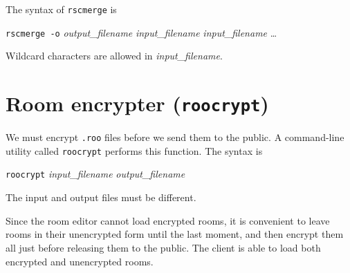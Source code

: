 The syntax of {\tt rscmerge} is

{\tt rscmerge -o} {\em output\_filename} {\em input\_filename} {\em
input\_filename} \dots

\noindent
Wildcard characters are allowed in {\em input\_filename}.

\section{Room encrypter ({\tt roocrypt})}

We must encrypt {\tt .roo} files before we send them to the public.  A
command-line utility called {\tt roocrypt} performs this function.
The syntax is

{\tt roocrypt} {\em input\_filename} {\em output\_filename}

\noindent
The input and output files must be different.

Since the room editor cannot load encrypted rooms, it is convenient to
leave rooms in their unencrypted form until the last moment, and then
encrypt them all just before releasing them to the public.  The client
is able to load both encrypted and unencrypted rooms.